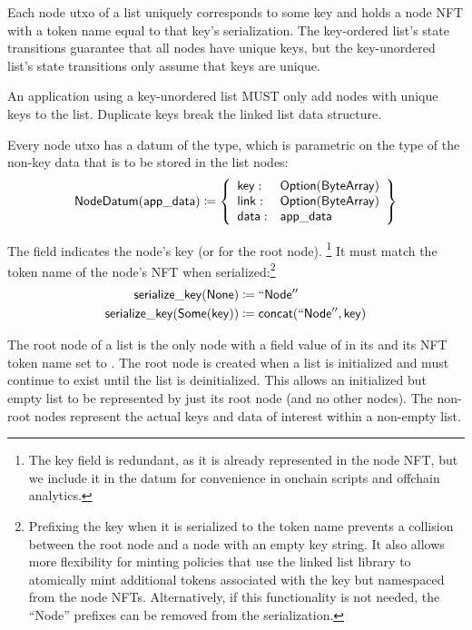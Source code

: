 \documentclass[../midgard.tex]{subfiles}
\begin{document}
Each node utxo of a list uniquely corresponds to some  key and holds a node NFT with a token name equal to that key's serialization.
The key-ordered list's state transitions guarantee that all nodes have unique keys, but the key-unordered list's state transitions only assume that keys are unique.

\newcommand{\unorderedListWarning}[0]{
\begin{warningblock}
An application using a key-unordered list MUST only add nodes with unique keys to the list.
Duplicate keys break the linked list data structure.
\end{warningblock}
}
\unorderedListWarning

Every node utxo has a datum of the  type, which is parametric on the  type of the non-key data that is to be stored in the list nodes:
\begin{equation*}
    \mathsf{NodeDatum} (\mathsf{app\_data}) \coloneq \left\{
    \begin{array}{ll}
        \mathsf{key}  : & \mathsf{Option}(\mathsf{ByteArray}) \\
        \mathsf{link} : & \mathsf{Option}(\mathsf{ByteArray}) \\
        \mathsf{data} : & \mathsf{app\_data}
    \end{array} \right\}
\end{equation*}

The  field indicates the node's key (or  for the root node).
\footnote{The key field is redundant, as it is already represented in the node NFT, but we include it in the datum for convenience in onchain scripts and offchain analytics.} It must match the token name of the node's NFT when serialized:\footnote{Prefixing the key when it is serialized to the token name prevents a collision between the root node and a node with an empty key string.
It also allows more flexibility for minting policies that use the linked list library to atomically mint additional tokens associated with the key but namespaced from the node NFTs.
Alternatively, if this functionality is not needed, the ``Node'' prefixes can be removed from the serialization.}
\begin{align*}
    \mathsf{serialize\_key} (\mathsf{None}) &\coloneq \mathsf{``Node''} \\
    \mathsf{serialize\_key} (\mathsf{Some} (\mathsf{key})) &\coloneq \mathsf{concat(``Node'', key)} 
\end{align*}

The root node of a list is the only node with a  field value of  in its  and its NFT token name set to .
The root node is created when a list is initialized and must continue to exist until the list is deinitialized.
This allows an initialized but empty list to be represented by just its root node (and no other nodes).
The non-root nodes represent the actual keys and data of interest within a non-empty list.
\end{document}
